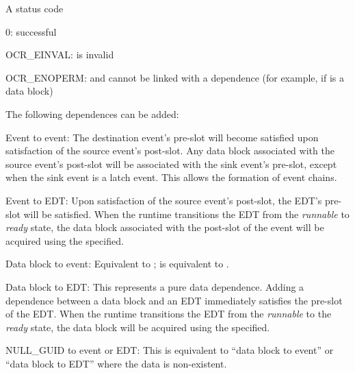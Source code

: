 \returns
A status code
\begin{DoxyItemize}
\item 0\-: successful
\item OCR\_EINVAL:  is invalid
\item OCR\_ENOPERM:  and  cannot be linked with
  a dependence (for example, if  is a data block)
\end{DoxyItemize}

\descr
The following dependences can be added:
\begin{DoxyItemize}
\item Event to event: The destination event's pre-slot will become satisfied
  upon satisfaction of the source event's post-slot. Any data block associated
  with the source event's post-slot will be associated with the sink event's pre-slot,
  except when the sink event is a latch event. This allows the formation of event chains.
\item Event to EDT: Upon satisfaction of the source event's post-slot, the EDT's
  pre-slot will be satisfied. When the runtime transitions the EDT from the
  \emph{runnable} to \emph{ready} state, the data block associated with the
  post-slot of the event will be acquired using the  specified.
\item Data block to event: Equivalent to \hyperlink{func_ocrEventSatisfySlot}{
  };  is
  equivalent to .
\item Data block to EDT: This represents a pure data dependence. Adding a
  dependence between a data block and an EDT immediately satisfies the pre-slot
  of the EDT. When the runtime transitions the EDT from the \emph{runnable}
  to the \emph{ready} state, the data block will be acquired using the
   specified.
\item NULL\_GUID to event or EDT: This is equivalent to ``data block to event''
  or ``data block to EDT'' where the data is non-existent.
\end{DoxyItemize}
